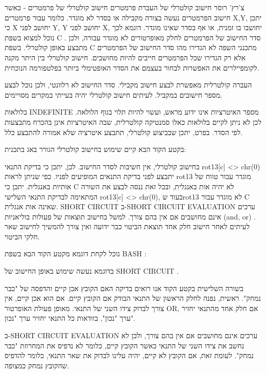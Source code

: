         צ'רץ' רוסר
        חישוב קולטרלי של העברת פרמטרים
        חישוב קולטרלי של פרמטרים - כאשר חישוב הפרמטרים נעשה בצורה מקבילה או בסדר לא מוגדר. כלומר עבור פרמטרים X,Y, יתכן כי X יחושב לפני Y, Y יחושב לפני X, יחושבו בו זמנית, או אף בסדר שאינו מוגדר. דוגמא לכך נוכל למצוא בשפת C . סדר החישוב של הפרמטרים לחלק מאופרטורים לא מוגדר עבורה, ולכן מתבצע באופן קולטרלי.
        בשפת C מתכנני השפה לא הגדירו מהו סדר החישוב של הפרמטרים אלא רק הגדירו שכל הפרמטרים חייבים להיות מחושבים. חישוב קולטרלי בין היתר מקנה לקומפיילרים את האפשרות לבחור בעצמם את הסדר האופטימלי ביותר בפלטפורמה הנוכחית.

        העברה קולטרלית מאפשרת לבצע חישוב מקבילי. סדר החישוב לא רלוונטי, ולכן נוכל לבצע מספר חישובים במקביל. לעיתים חישוב קולטרלי יהיה בעייתי במקרים מסויימים.

        בלולאות INDEFINITE מספר האיטרציות אינו ידוע מראש, ועשוי להיות תלוי בגוף הלולאה. לכן לא ניתן לקיים בלולאות כאלו סמנטיקה קולטרלית, שבה האיטרציות אינן בהכרח מתבצעות לפי הסדר. בפרט, יתכן שבביצוע קולטרלי, תתבצע איטרציה שלא אמורה להתבצע כלל.

        בקטע הקוד הבא קיים שימוש בחישוב קולטרלי הגורר באג בתכנית:

        בחישוב קולטרלי, אין חשיבות לסדר החישוב. לכן, יתכן כי בדיקת התנאי rot13[c] <> chr(0) יתבצע לפני בדיקת התנאים המופיעים לפניו. כפי שניתן לראות rot13 מוגדר עבור טווח של אותיות באנגלית. יתכן כי C לא יהיה אות באנגלית, ובכל זאת ננסה לבצע את השורה המתאימה לבדיקת התנאי השלישי rot13[c] <> chr(0), בעוד שrot13 לא מוגדר עבור C שאינה אות אנגלית.
        SHORT CIRCUIT
        ב-SHORT CIRCUIT EVALUATION ערכים אינם מחושבים אם אין בהם צורך. למשל בחישוב תוצאות של פעולות בוליאניות (and, or) .
        לעיתים לאחר חישוב חלק אחד תוצאת הביטוי כבר ידועה ואין צורך להמשיך לחישוב שאר חלקי הביטוי.

        נוכל לקחת דוגמא מקטע הקוד הבא בשפת BASH :

        בדוגמא נעשה שימוש באופן החישוב של SHORT CIRCUIT .

        בשורה השלישית בקטע הקוד אנו רואים בדיקה האם הקובץ אכן קיים והדפסה של "כבר
        נמחק". ראשית, נפנה לחלק הראשון של התנאי הבודק אם הקובץ קיים. אם הוא אכן קיים,
        אין צורך לבדוק צידו השני של התנאי. מאופן פעולת האופרטור OR, אם חלק אחד מהתנאי
        יחזיר ערך "נכון", בוודאות כל התנאי יחזיר ערך "נכון".

        ב-SHORT CIRCUIT EVALUATION ערכים אינם מחושבים אם אין בהם צורך, ולכן לא נחשב את
        צידו השני של התנאי כאשר הקובץ קיים, כלומר לא נדפיס את המחרוזת "כבר נמחק". לעומת
        זאת, אם הקובץ לא קיים, יהיה עלינו לבדוק את שאר התנאי, כלומר להדפיס שהקובץ נמחק
        כמצופה.


